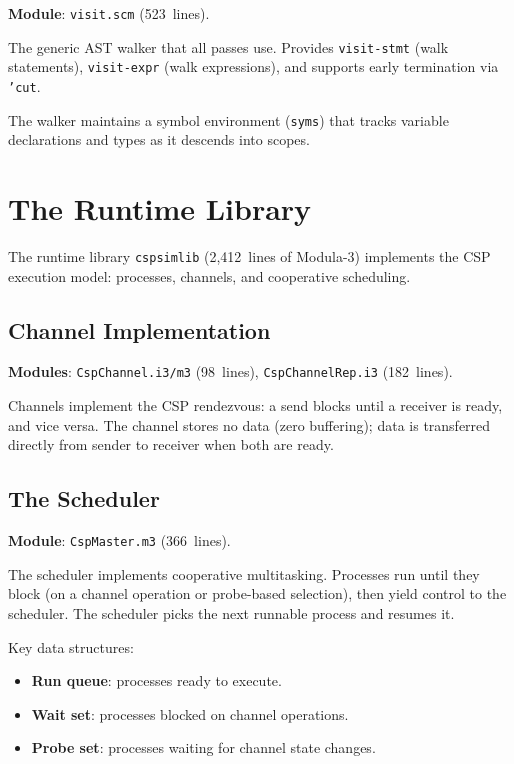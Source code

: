 \documentclass[11pt,letterpaper]{article}
\begin{document}
\textbf{Module}: \texttt{visit.scm} (523~lines).

The generic AST walker that all passes use.  Provides
\texttt{visit-stmt} (walk statements), \texttt{visit-expr} (walk
expressions), and supports early termination via \texttt{'cut}.

The walker maintains a symbol environment (\texttt{syms}) that
tracks variable declarations and types as it descends into scopes.


\section{The Runtime Library}
\label{sec:runtime}

The runtime library \texttt{cspsimlib} (2,412~lines of Modula-3)
implements the CSP execution model: processes, channels, and
cooperative scheduling.

\subsection{Channel Implementation}

\textbf{Modules}: \texttt{CspChannel.i3/m3} (98~lines),
\texttt{CspChannelRep.i3} (182~lines).

Channels implement the CSP rendezvous: a send blocks until a
receiver is ready, and vice versa.  The channel stores no data
(zero buffering); data is transferred directly from sender to
receiver when both are ready.

\subsection{The Scheduler}

\textbf{Module}: \texttt{CspMaster.m3} (366~lines).

The scheduler implements cooperative multitasking.  Processes run
until they block (on a channel operation or probe-based selection),
then yield control to the scheduler.  The scheduler picks the next
runnable process and resumes it.

Key data structures:
\begin{itemize}[nosep]
  \item \textbf{Run queue}: processes ready to execute.
  \item \textbf{Wait set}: processes blocked on channel operations.
  \item \textbf{Probe set}: processes waiting for channel state changes.
\end{itemize}
\end{document}
